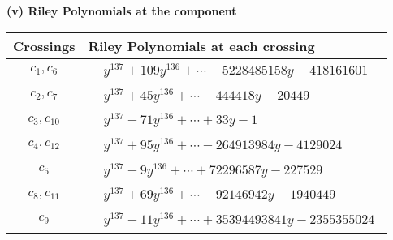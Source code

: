 \documentclass[1p]{elsarticle_modified}
\theoremstyle{definition}
\begin{document}
\newpage\renewcommand{\arraystretch}{1}
\flushleft \textbf{(v) Riley Polynomials at the component}\newline \\
\begin{tabular}{m{50pt}|m{274pt}}
Crossings & \hspace{64pt}Riley Polynomials at each crossing \\
\hline $$\begin{aligned}c_{1},c_{6}\end{aligned}$$&$\begin{aligned}
&y^{137}+109 y^{136}+\cdots-5228485158 y-418161601
\end{aligned}$\\
\hline $$\begin{aligned}c_{2},c_{7}\end{aligned}$$&$\begin{aligned}
&y^{137}+45 y^{136}+\cdots-444418 y-20449
\end{aligned}$\\
\hline $$\begin{aligned}c_{3},c_{10}\end{aligned}$$&$\begin{aligned}
&y^{137}-71 y^{136}+\cdots+33 y-1
\end{aligned}$\\
\hline $$\begin{aligned}c_{4},c_{12}\end{aligned}$$&$\begin{aligned}
&y^{137}+95 y^{136}+\cdots-264913984 y-4129024
\end{aligned}$\\
\hline $$\begin{aligned}c_{5}\end{aligned}$$&$\begin{aligned}
&y^{137}-9 y^{136}+\cdots+72296587 y-227529
\end{aligned}$\\
\hline $$\begin{aligned}c_{8},c_{11}\end{aligned}$$&$\begin{aligned}
&y^{137}+69 y^{136}+\cdots-92146942 y-1940449
\end{aligned}$\\
\hline $$\begin{aligned}c_{9}\end{aligned}$$&$\begin{aligned}
&y^{137}-11 y^{136}+\cdots+35394493841 y-2355355024
\end{aligned}$\\
\hline
\end{tabular}\\~\\
\end{document}
